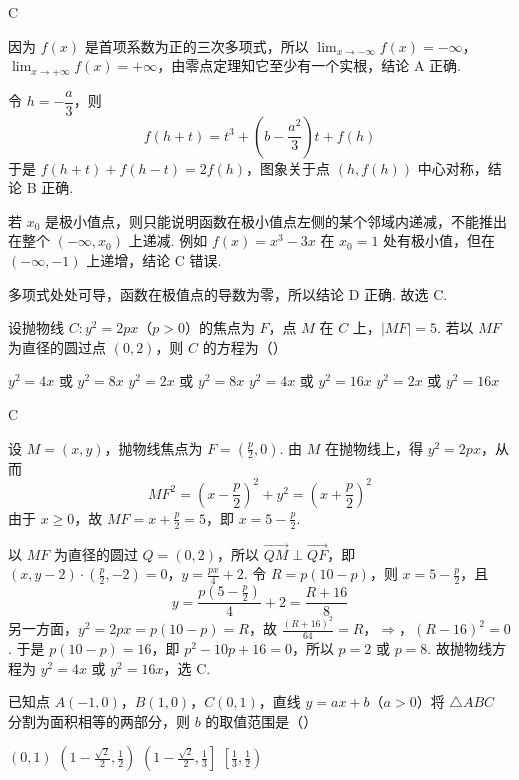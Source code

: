 \begin{answer}
C
\end{answer}

\begin{solution}
因为 \(f(x)\) 是首项系数为正的三次多项式，所以
\(\displaystyle\lim_{x\to-\infty}f(x)=-\infty\)，\(\displaystyle\lim_{x\to+\infty}f(x)=+\infty\)，由零点定理知它至少有一个实根，结论 A 正确.

令 \(h=-\dfrac a3\)，则
\[
f(h+t)=t^3+\left(b-\frac{a^2}{3}\right)t+f(h)
\]
于是 \(f(h+t)+f(h-t)=2f(h)\)，图象关于点 \((h,f(h))\) 中心对称，结论 B 正确.

若 \(x_0\) 是极小值点，则只能说明函数在极小值点左侧的某个邻域内递减，不能推出在整个 \((-\infty,x_0)\) 上递减. 例如 \(f(x)=x^3-3x\) 在 \(x_0=1\) 处有极小值，但在 \((-\infty,-1)\) 上递增，结论 C 错误.

多项式处处可导，函数在极值点的导数为零，所以结论 D 正确. 故选 C.
\end{solution}

\begin{problem}
设抛物线 \(C: y^2 = 2px\)（\(p > 0\)）的焦点为 \(F\)，点 \(M\) 在 \(C\) 上，\(|MF| = 5\). 若以 \(MF\) 为直径的圆过点 \((0,2)\)，则 \(C\) 的方程为（\quad）

\choices
    {\(y^2 = 4x\) 或 \(y^2 = 8x\)}
    {\(y^2 = 2x\) 或 \(y^2 = 8x\)}
    {\(y^2 = 4x\) 或 \(y^2 = 16x\)}
    {\(y^2 = 2x\) 或 \(y^2 = 16x\)}
\end{problem}

\begin{answer}
C
\end{answer}

\begin{solution}
设 \(M=(x,y)\)，抛物线焦点为 \(F=(\frac{p}{2},0)\). 由 \(M\) 在抛物线上，得 \(y^2=2px\)，从而
\[
MF^2=\left(x-\frac p2\right)^2+y^2
=\left(x+\frac p2\right)^2
\]
由于 \(x\geqslant0\)，故 \(MF=x+\frac{p}{2}=5\)，即 \(x=5-\frac{p}{2}\).

以 \(MF\) 为直径的圆过 \(Q=(0,2)\)，所以 \(\overrightarrow{QM}\perp\overrightarrow{QF}\)，即
\(\left(x,y-2\right)\cdot\left(\frac p2,-2\right)=0\)，\(y=\frac{px}{4}+2\).
令 \(R=p(10-p)\)，则 \(x=5-\frac{p}{2}\)，且
\[
y=\frac{p(5-\frac{p}{2})}4+2=\frac{R+16}{8}
\]
另一方面，\(y^2=2px=p(10-p)=R\)，故
\(\frac{(R+16)^2}{64}=R\)，\(\Longrightarrow\)，\((R-16)^2=0\).
于是 \(p(10-p)=16\)，即 \(p^2-10p+16=0\)，所以 \(p=2\) 或 \(p=8\). 故抛物线方程为 \(y^2=4x\) 或 \(y^2=16x\)，选 C.
\end{solution}

\begin{problem}
已知点 \(A(-1, 0)\)，\(B(1, 0)\)，\(C(0, 1)\)，直线 \(y = ax + b\)（\(a > 0\)）将 \(\triangle ABC\) 分割为面积相等的两部分，则 \(b\) 的取值范围是（\quad）

\choices
    {\((0, 1)\)}
    {\(\left(1 - \frac{\sqrt{2}}{2}, \frac{1}{2}\right)\)}
    {\(\left(1 - \frac{\sqrt{2}}{2}, \frac{1}{3}\right]\)}
    {\(\left[\frac{1}{3}, \frac{1}{2}\right)\)}
\end{problem}

